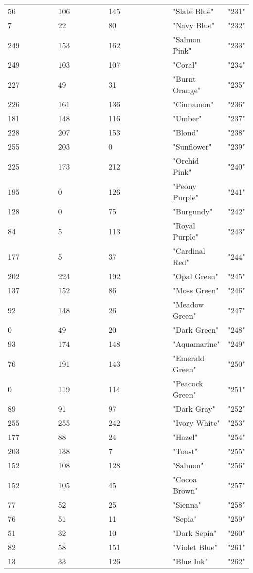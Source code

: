 \begin{longtable}{p{0.3\linewidth} p{0.3\linewidth} p{0.4\linewidth}}
56 &  106 &  145 &  "Slate Blue" &  "231"\\
7 &  22 &  80 &  "Navy Blue" &  "232"\\
249 &  153 &  162 &  "Salmon Pink" &  "233"\\
249 &  103 &  107 &  "Coral" &  "234"\\
227 &  49 &  31 &  "Burnt Orange" &  "235"\\
226 &  161 &  136 &  "Cinnamon" &  "236"\\
181 &  148 &  116 &  "Umber" &  "237"\\
228 &  207 &  153 &  "Blond" &  "238"\\
255 &  203 &  0 &  "Sunflower" &  "239"\\
225 &  173 &  212 &  "Orchid Pink" &  "240"\\
195 &  0 &  126 &  "Peony Purple" &  "241"\\
128 &  0 &  75 &  "Burgundy" &  "242"\\
84 &  5 &  113 &  "Royal Purple" &  "243"\\
177 &  5 &  37 &  "Cardinal Red" &  "244"\\
202 &  224 &  192 &  "Opal Green" &  "245"\\
137 &  152 &  86 &  "Moss Green" &  "246"\\
92 &  148 &  26 &  "Meadow Green" &  "247"\\
0 &  49 &  20 &  "Dark Green" &  "248"\\
93 &  174 &  148 &  "Aquamarine" &  "249"\\
76 &  191 &  143 &  "Emerald Green" &  "250"\\
0 &  119 &  114 &  "Peacock Green" &  "251"\\
89 &  91 &  97 &  "Dark Gray" &  "252"\\
255 &  255 &  242 &  "Ivory White" &  "253"\\
177 &  88 &  24 &  "Hazel" &  "254"\\
203 &  138 &  7 &  "Toast" &  "255"\\
152 &  108 &  128 &  "Salmon" &  "256"\\
152 &  105 &  45 &  "Cocoa Brown" &  "257"\\
77 &  52 &  25 &  "Sienna" &  "258"\\
76 &  51 &  11 &  "Sepia" &  "259"\\
51 &  32 &  10 &  "Dark Sepia" &  "260"\\
82 &  58 &  151 &  "Violet Blue" &  "261"\\
13 &  33 &  126 &  "Blue Ink" &  "262"\\

\end{longtable}
